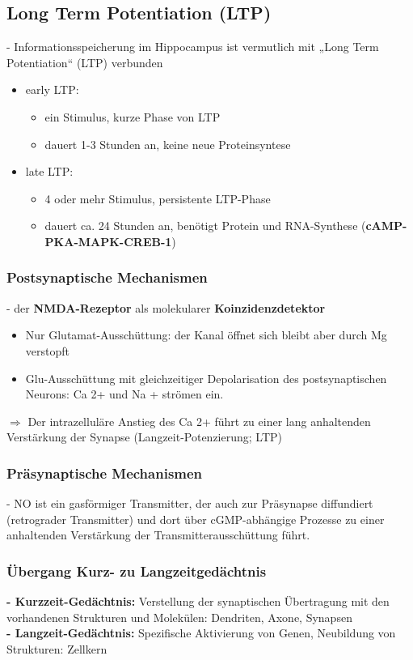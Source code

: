 \subsection{Long Term Potentiation (LTP)}
 - Informationsspeicherung im Hippocampus ist vermutlich mit „Long Term Potentiation“ (LTP) verbunden

\begin{itemize}
	\item early LTP:
	\begin{itemize}
		\item ein Stimulus, kurze Phase von LTP
		\item dauert 1-3 Stunden an, keine neue Proteinsyntese
	\end{itemize}
	\item late LTP:
	\begin{itemize}
		\item 4 oder mehr Stimulus, persistente LTP-Phase
		\item dauert ca. 24 Stunden an, benötigt Protein und RNA-Synthese (\textbf{cAMP-PKA-MAPK-CREB-1})
	\end{itemize}
\end{itemize}

\subsubsection{Postsynaptische Mechanismen}
 - der \textbf{NMDA-Rezeptor} als molekularer \textbf{Koinzidenzdetektor}
\begin{itemize}
	\item Nur Glutamat-Ausschüttung: der Kanal öffnet sich bleibt aber durch Mg verstopft
	\item Glu-Ausschüttung mit gleichzeitiger Depolarisation des postsynaptischen Neurons: Ca 2+ und Na + strömen ein.
\end{itemize}

$\Rightarrow$ Der intrazelluläre Anstieg des Ca 2+ führt zu einer lang anhaltenden Verstärkung der Synapse (Langzeit-Potenzierung; LTP)

\subsubsection{Präsynaptische Mechanismen}
 - NO ist ein gasförmiger Transmitter, der auch zur Präsynapse diffundiert (retrograder Transmitter) und dort über cGMP-abhängige Prozesse zu einer anhaltenden Verstärkung der Transmitterausschüttung führt.

\subsubsection{Übergang Kurz- zu Langzeitgedächtnis}
\textbf{ - Kurzzeit-Gedächtnis:} Verstellung der synaptischen Übertragung mit den vorhandenen Strukturen und Molekülen: Dendriten, Axone, Synapsen\\
\textbf{ - Langzeit-Gedächtnis:} Spezifische Aktivierung von Genen, Neubildung von Strukturen: Zellkern\\

